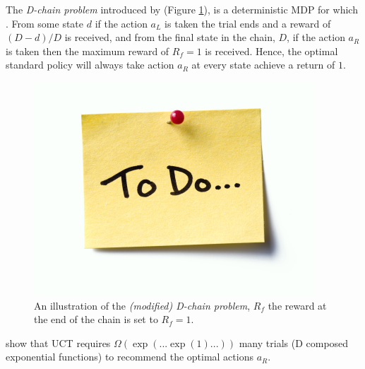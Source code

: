     The \textit{D-chain problem} introduced by  (Figure \ref{fig:modified_d_chain}), is a deterministic MDP for which . From some state $d$ if the action $a_L$ is taken the trial ends and a reward of $(D-d)/D$ is received, and from the final state in the chain, $D$, if the action $a_R$ is taken then the maximum reward of $R_f=1$ is received. Hence, the optimal standard policy will always take action $a_R$ at every state achieve a return of $1$.
    \begin{figure}
        \centering
        \includegraphics[scale=0.6]{figures/todo.jpg}
        \caption[An illustration of the \textit{(modified) D-chain problem}.]{An illustration of the \textit{(modified) D-chain problem},  $R_f$   the reward at the end of the chain is set to $R_f=1$.}
        \label{fig:modified_d_chain}
    \end{figure}

     show that UCT requires $\Omega(\exp(...\exp(1)...))$ many trials (D composed exponential functions) to recommend the optimal actions $a_R$. 

